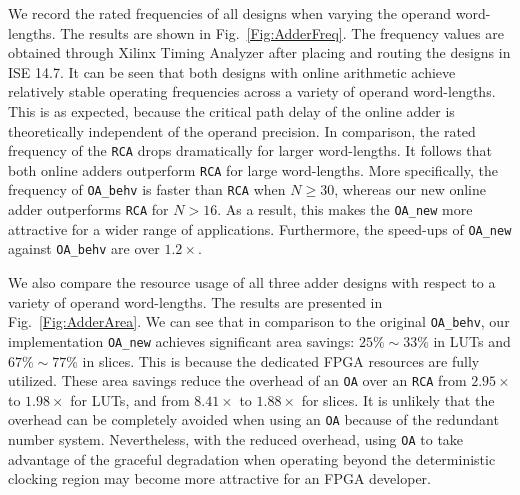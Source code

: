 \documentclass[conference]{IEEEtran}
\begin{document}
We record the rated frequencies of all designs when varying the operand word-lengths. The results are shown in Fig.~\ref{Fig:AdderFreq}. The frequency values are obtained through Xilinx Timing Analyzer after placing and routing the designs in ISE 14.7. It can be seen that both designs with online arithmetic achieve relatively stable operating frequencies across a variety of operand word-lengths. This is as expected, because the critical path delay of the online adder is theoretically independent of the operand precision. In comparison, the rated frequency of the \texttt{RCA} drops dramatically for larger word-lengths. It follows that both online adders outperform \texttt{RCA} for large word-lengths. More specifically, the frequency of \texttt{OA\_behv} is faster than \texttt{RCA} when $N\geqslant30$, whereas our new online adder outperforms \texttt{RCA} for $N>16$. As a result, this makes the \texttt{OA\_new} more attractive for a wider range of applications. Furthermore, the speed-ups of \texttt{OA\_new} against \texttt{OA\_behv} are over $1.2\times$.\vspace{-0.5ex}



We also compare the resource usage of all three adder designs with respect to a variety of operand word-lengths. The results are presented in Fig.~\ref{Fig:AdderArea}. We can see that in comparison to the original \texttt{OA\_behv}, our implementation \texttt{OA\_new} achieves significant area savings: $25\%\sim 33\%$ in LUTs and $67\%\sim77\%$ in slices. This is because the dedicated FPGA resources are fully utilized. These area savings reduce the overhead of an \texttt{OA} over an \texttt{RCA} from $2.95\times$ to $1.98\times$ for LUTs, and from $8.41\times$ to $1.88\times$ for slices. It is unlikely that the overhead can be completely avoided when using an \texttt{OA} because of the redundant number system. Nevertheless, with the reduced overhead, using \texttt{OA} to take advantage of the graceful degradation when operating beyond the deterministic clocking region may become more attractive for an FPGA developer.\vspace{-0.5ex}
\end{document}
